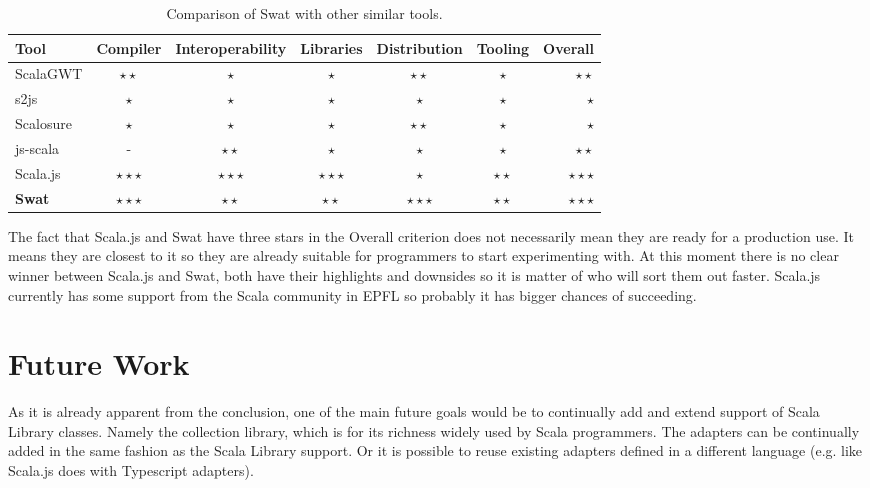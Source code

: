 \documentclass[12pt,a4paper]{report}
\begin{document}
\begin{table}[h]\footnotesize
	\def\arraystretch{1.5}
	\centering
	\begin{tabular}{l || c | c | c | c | c  || r}
		Tool				& Compiler 						& Interoperability	& Libraries 				& Distribution			& Tooling 					& Overall 					\\
		\hline						
	  ScalaGWT		& $\star\star$				&	$\star$						& $\star$						& $\star\star$			&	$\star$						& $\star\star$			\\
		s2js				& $\star$							& $\star$ 					& $\star$ 					&	$\star$						& $\star$						& $\star$			 			\\
		Scalosure		& $\star$							& $\star$ 					& $\star$ 					& $\star\star$			& $\star$						& $\star$			  		\\
		js-scala		& - 									& $\star\star$ 			& $\star$						& $\star$ 					& $\star$ 					& $\star\star$ 			\\
		Scala.js		& $\star\star\star$ 	& $\star\star\star$	& $\star\star\star$ &	$\star$						& $\star\star$			& $\star\star\star$ \\
		{\bf Swat}	& $\star\star\star$ 	& $\star\star$			& $\star\star$			& $\star\star\star$	& $\star\star$			& $\star\star\star$ \\
	\end{tabular}
	\caption{Comparison of Swat with other similar tools.}
	\label{tbl:Comparison}
\end{table}

The fact that Scala.js and Swat have three stars in the Overall criterion does not necessarily mean they are ready for a production use. It means they are closest to it so they are already suitable for programmers to start experimenting with. At this moment there is no clear winner between Scala.js and Swat, both have their highlights and downsides so it is matter of who will sort them out faster. Scala.js currently has some support from the Scala community in EPFL so probably it has bigger chances of succeeding.

\section{Future Work}

As it is already apparent from the conclusion, one of the main future goals would be to continually add and extend support of Scala Library classes. Namely the collection library, which is for its richness widely used by Scala programmers. The adapters can be continually added in the same fashion as the Scala Library support. Or it is possible to reuse existing adapters defined in a different language (e.g. like Scala.js does with Typescript adapters).
\end{document}
